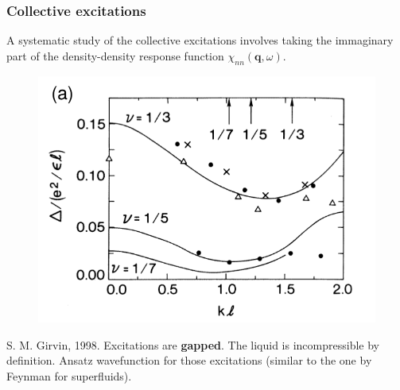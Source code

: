 \documentclass{beamer}
\begin{document}
\begin{frame}
\frametitle{Collective excitations}
\begin{center}

A systematic study of the collective excitations involves taking the immaginary part of the density-density response function $\chi_{nn}(\mathbf{q}, \omega)$. 

\begin{figure}[!htb]
\centering
\includegraphics[scale=0.25]{neutral.png}
\end{figure}
S. M. Girvin, 1998. Excitations are \textbf{gapped}. The liquid is incompressible by definition. Ansatz wavefunction for those excitations (similar to the one by Feynman for superfluids).

\end{center}
\end{frame}

\end{document}
